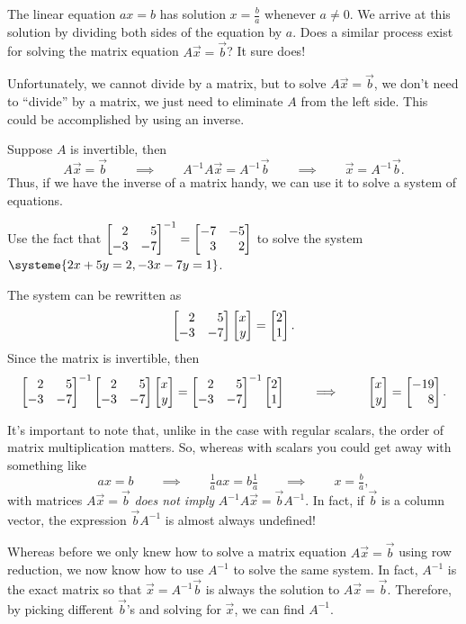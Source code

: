 
The linear equation $ax=b$ has solution $x=\frac{b}{a}$ whenever $a\neq 0$.  We arrive at this solution by
dividing both sides of the equation by $a$. Does a similar process exist for solving the matrix equation $A\vec x=\vec b$? It
sure does!

Unfortunately, we cannot divide by a matrix, but to solve $A\vec x=\vec b$, we don't need to ``divide'' by a matrix, we just need to
eliminate $A$ from the left side. This could be accomplished by using an inverse.

Suppose $A$ is invertible, then
\[
	A\vec x=\vec b\qquad\implies\qquad A^{-1}A\vec x=A^{-1}\vec b\qquad\implies\qquad \vec x=A^{-1}\vec b.
\]
Thus, if we have the inverse of a matrix handy, we can use it to solve a system of equations.

\begin{example}
	Use the fact that $\mat{2&5\\-3&-7}^{-1}=\mat{-7&-5\\3&2}$ to solve the system $\systeme{2x+5y=2,-3x-7y=1}$.

	The system can be rewritten as
	\[
	    \mat{2&5\\-3&-7}\mat{x\\y}=\mat{2\\1}.
	\]
	Since the matrix is invertible, then
	\[
	    \mat{2&5\\-3&-7}^{-1}\mat{2&5\\-3&-7}\mat{x\\y}=\mat{2&5\\-3&-7}^{-1}\mat{2\\1}\qquad\implies\qquad\mat{x\\y}=\mat{-19\\8}.
	\]
\end{example}

It's important to note that, unlike in the case with regular scalars, the order of matrix multiplication matters.
So, whereas with scalars you could get away with something like
\[
	ax=b \qquad\implies \qquad \tfrac{1}{a}ax=b\tfrac{1}{a}\qquad\implies \qquad x=\tfrac{b}{a},
\]
with matrices $A\vec x=\vec b$ \emph{does not imply} $A^{-1}A\vec x=\vec b A^{-1}$. In fact, if $\vec b$ is a column
vector, the expression $\vec bA^{-1}$ is almost always undefined!

Whereas before we only knew how to solve a matrix equation $A\vec x=\vec b$ using row reduction, we now
know how to use $A^{-1}$ to solve the same system. In fact, $A^{-1}$ is the exact matrix so that $\vec x=A^{-1}\vec b$
is always the solution to $A\vec x=\vec b$. Therefore, by picking different $\vec b$'s and solving for $\vec x$, we
can find $A^{-1}$.

